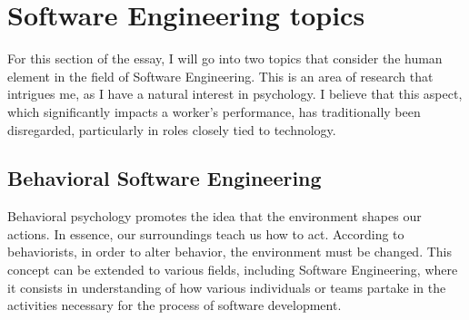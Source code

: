 \documentclass[11pt]{article}
\begin{document}
\section{Software Engineering topics}




For this section of the essay, I will go into two topics that consider the human element in the field of Software Engineering. This is an area of research that intrigues me, as I have a natural interest in psychology. I believe that this aspect, which significantly impacts a worker's performance, has traditionally been disregarded, particularly in roles closely tied to technology.

\subsection{Behavioral Software Engineering}

Behavioral psychology promotes the idea that the environment shapes our actions. In essence, our surroundings teach us how to act. According to behaviorists, in order to alter behavior, the environment must be changed. This concept can be extended to various fields, including Software Engineering, where it consists in understanding of how various individuals or teams partake in the  activities necessary for the process of software development.
\end{document}
